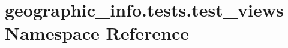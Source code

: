 \hypertarget{namespacegeographic__info_1_1tests_1_1test__views}{\section{geographic\-\_\-info.\-tests.\-test\-\_\-views Namespace Reference}
\label{namespacegeographic__info_1_1tests_1_1test__views}
}
